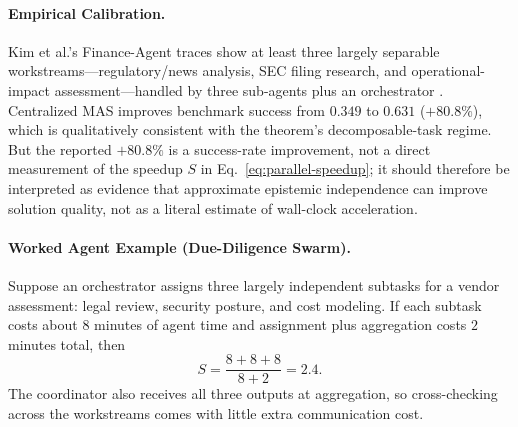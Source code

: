 \paragraph{Empirical Calibration.} Kim et al.'s Finance-Agent traces show at least three largely separable workstreams---regulatory/news analysis, SEC filing research, and operational-impact assessment---handled by three sub-agents plus an orchestrator \cite{kim2025scaling}. Centralized MAS improves benchmark success from $0.349$ to $0.631$ ($+80.8\%$), which is qualitatively consistent with the theorem's decomposable-task regime. But the reported $+80.8\%$ is a success-rate improvement, not a direct measurement of the speedup $S$ in Eq.~\eqref{eq:parallel-speedup}; it should therefore be interpreted as evidence that approximate epistemic independence can improve solution quality, not as a literal estimate of wall-clock acceleration.

\paragraph{Worked Agent Example (Due-Diligence Swarm).}
Suppose an orchestrator assigns three largely independent subtasks for a vendor assessment: legal review, security posture, and cost modeling. If each subtask costs about $8$ minutes of agent time and assignment plus aggregation costs $2$ minutes total, then
\[
S = \frac{8+8+8}{8+2} = 2.4.
\]
The coordinator also receives all three outputs at aggregation, so cross-checking across the workstreams comes with little extra communication cost.

